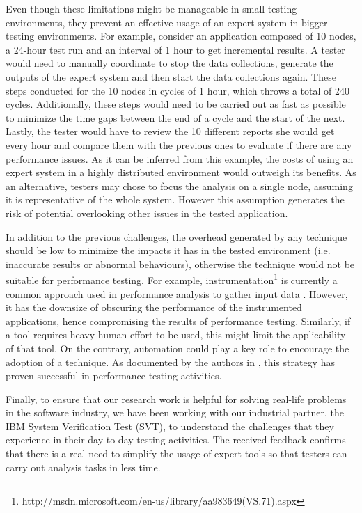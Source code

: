 \documentclass[runningheads,a4paper]{llncs}
\begin{document}
Even though these limitations might be manageable in small testing environments,
they prevent an effective usage of an expert system in bigger testing
environments. For example, consider an application composed of 10 nodes, a
24-hour test run and an interval of 1 hour to get incremental results. A tester
would need to manually coordinate to stop the data collections, generate the
outputs of the expert system and then start the data collections again. These
steps conducted for the 10 nodes in cycles of 1 hour, which throws a total of
240 cycles. Additionally, these steps would need to be carried out as fast as
possible to minimize the time gaps between the end of a cycle and the start of
the next. Lastly, the tester would have to review the 10 different reports she
would get every hour and compare them with the previous ones to evaluate if
there are any performance issues. As it can be inferred from this example, the
costs of using an expert system in a highly distributed environment would
outweigh its benefits. As an alternative, testers may chose to focus the analysis on a single node, assuming it is representative of the whole system. However this
assumption generates the risk of potential overlooking other issues in the
tested application.

In addition to the previous challenges, the overhead generated by any technique
should be low to minimize the impacts it has in the tested environment (i.e.
inaccurate results or abnormal behaviours), otherwise the technique would not be
suitable for performance testing. For example,
instrumentation\footnote{http://msdn.microsoft.com/en-us/library/aa983649(VS.71).aspx}
is currently a common approach used in performance analysis to gather input data
\cite{Yang1,Hangal1,Csallner1,Chen2}. However, it has the downsize of obscuring
the performance of the instrumented applications, hence compromising the results of 
performance testing. Similarly, if a tool requires heavy human effort to be
used, this might limit the applicability of that tool. On the contrary, automation 
could play a key role to encourage the adoption of a technique. As documented by
the authors in \cite{Shahamiri1}, this strategy has proven successful in
performance testing activities.

Finally, to ensure that our research work is helpful for solving real-life
problems in the software industry, we have been working with our industrial
partner, the IBM System Verification Test (SVT), to understand the challenges
that they experience in their day-to-day testing activities. The received
feedback confirms that there is a real need to simplify the usage of expert
tools so that testers can carry out analysis tasks in less time.
\end{document}
